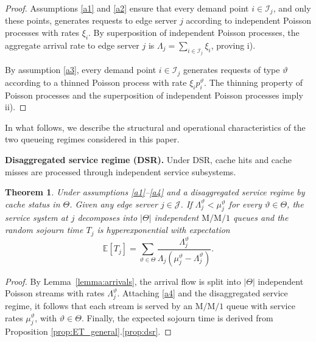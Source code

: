 \documentclass[a4paper,11pt,reqno]{amsart}
\newtheorem{theorem}{Theorem}
\newcommand{\I}{\mathcal{I}}
\newcommand{\J}{\mathcal{J}}
\begin{document}
\begin{proof}
    Assumptions \ref{a1} and \ref{a2} ensure that every demand point $i\in\I_j$, and only these points, generates requests to edge server $j$ according to independent Poisson processes with rates $\xi_i$. By superposition of independent Poisson processes, the aggregate arrival rate to edge server $j$ is $\Lambda_j = \sum_{i\in\I_j}\xi_i$, proving i).

    By assumption \ref{a3}, every demand point $i\in\I_j$ generates requests of type $\vartheta$ according to a thinned Poisson process with rate $\xi_i p^\vartheta_i$. The thinning property of Poisson processes and the superposition of independent Poisson processes imply ii).
\end{proof}
In what follows, we describe the structural and operational characteristics of the two queueing regimes considered in this paper.

\noindent \textbf{Disaggregated service regime (DSR).} Under DSR, cache hits and cache misses are processed through independent service subsystems.

\begin{theorem}\label{lemma:dsr}
Under assumptions \ref{a1}--\ref{a4} and a disaggregated service regime by cache status in $\Theta$. Given any edge server $j\in\J$. If $
\Lambda^\vartheta_j < \mu^\vartheta_j$
for every $\vartheta \in \Theta$, the service system at $j$ decomposes into $|\Theta|$ independent $\mathrm{M}/\mathrm{M}/1$ queues and the random sojourn time $T_j$ is hyperexponential with expectation
\begin{equation}\label{eq:expected_dsr}
    \mathbb{E}[T_j] = \sum_{\vartheta \in \Theta}
\frac{\Lambda_j^\vartheta}{\Lambda_j(\mu_j^\vartheta-\Lambda_j^\vartheta)}.
\end{equation}
\end{theorem}

\begin{proof}
By Lemma~\ref{lemma:arrivals}, the arrival flow is split into $|\Theta|$ independent Poisson streams with rates $\Lambda_j^\vartheta$. Attaching \ref{a4} and the disaggregated service regime, it follows that each stream is served by an $\mathrm{M}/\mathrm{M}/1$ queue with service rates $\mu_j^\vartheta$, with $\vartheta \in\Theta$. Finally, the expected sojourn time is derived from Proposition \ref{prop:ET_general}.\ref{prop:dsr}.
\end{proof}
\end{document}
